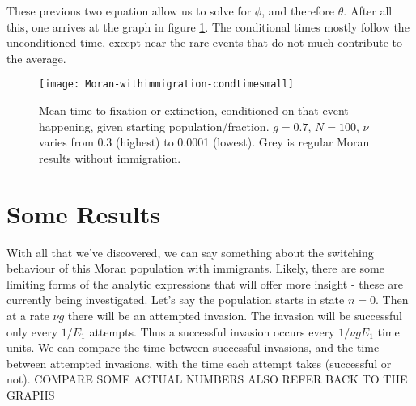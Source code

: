 These previous two equation allow us to solve for $\phi$, and therefore $\theta$. 
After all this, one arrives at the graph in figure \ref{condextntimefig}. 
The conditional times mostly follow the unconditioned time, except near the rare events that do not much contribute to the average. 
\begin{figure}[ht]
	\centering
	\texttt{[image: Moran-withimmigration-condtimesmall]}
	\caption{Mean time to fixation or extinction, conditioned on that event happening, given starting population/fraction. $g=0.7$, $N=100$, $\nu$ varies from 0.3 (highest) to 0.0001 (lowest). Grey is regular Moran results without immigration. } \label{condextntimefig}
\end{figure}

\section{Some Results}
With all that we've discovered, we can say something about the switching behaviour of this Moran population with immigrants. 
Likely, there are some limiting forms of the analytic expressions that will offer more insight - these are currently being investigated. 
Let's say the population starts in state $n=0$.  
Then at a rate $\nu g$ there will be an attempted invasion.  
The invasion will be successful only every $1/E_1$ attempts.  
Thus a successful invasion occurs every $1/\nu g E_1$ time units.  
We can compare the time between successful invasions, and the time between attempted invasions, with the time each attempt takes (successful or not). 
COMPARE SOME ACTUAL NUMBERS
ALSO REFER BACK TO THE GRAPHS


